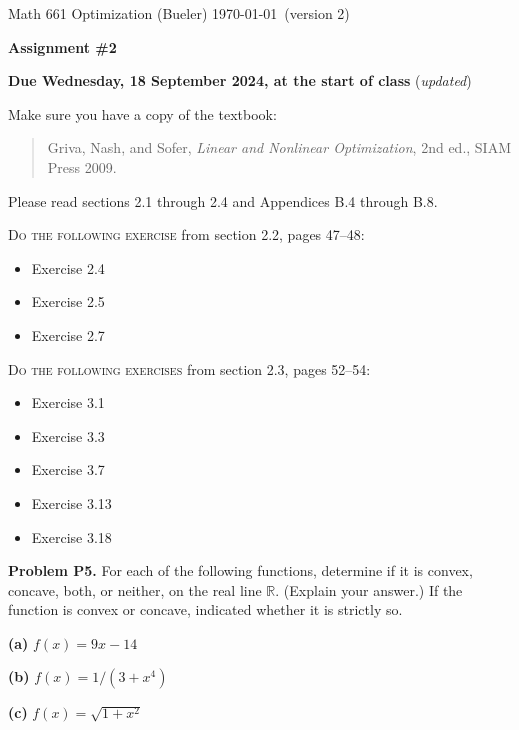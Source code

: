 \documentclass[12pt]{amsart}
\newcommand{\RR}{\mathbb{R}}
\newcommand{\prob}[1]{\bigskip\noindent\textbf{#1}\quad }
\newcommand{\epart}[1]{\medskip\noindent\textbf{(#1)}\quad }
\begin{document}
\scriptsize \noindent Math 661 Optimization (Bueler) \hfill \today\, (version 2)
\normalsize

\medskip\bigskip

\Large\centerline{\textbf{Assignment \#2}}
\large
\bigskip

\centerline{\textbf{Due Wednesday, 18 September 2024, at the start of class} (\emph{updated})}
\bigskip
\normalsize

\thispagestyle{empty}

\bigskip
\noindent Make sure you have a copy of the textbook:

\begin{quote}
Griva, Nash, and Sofer, \emph{Linear and Nonlinear Optimization}, 2nd ed., SIAM Press 2009.
\end{quote}

\noindent Please read sections 2.1 through 2.4 and Appendices B.4 through B.8.

\bigskip
\noindent \textsc{Do the following exercise} from section 2.2, pages 47--48:

\begin{itemize}
\item Exercise 2.4
\item Exercise 2.5
\item Exercise 2.7
\end{itemize}

\bigskip
\noindent \textsc{Do the following exercises} from section 2.3, pages 52--54:

\begin{itemize}
\item Exercise 3.1
\item Exercise 3.3
\item Exercise 3.7
\item Exercise 3.13
\item Exercise 3.18
\end{itemize}

\prob{Problem P5.}  For each of the following functions, determine if it is convex, concave, both, or neither, on the real line $\RR$.  (Explain your answer.)  If the function is convex or concave, indicated whether it is strictly so.

\epart{a}  $f(x) = 9x - 14$

\epart{b}  $f(x) = 1 / (3+x^4)$

\epart{c}  $f(x) = \sqrt{1 + x^2}$
\end{document}
